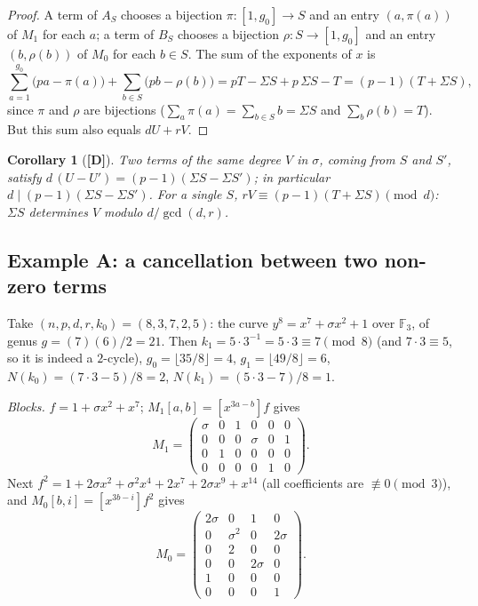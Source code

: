 \documentclass[11pt,a4paper]{article}
\newtheorem{corollary}[theorem]{Corollary}
\newcommand{\F}{\mathbb{F}}
\begin{document}
\begin{proof}
A term of $A_S$ chooses a bijection $\pi:[1,g_0]\to S$ and an entry
$(a,\pi(a))$ of $M_1$ for each $a$; a term of $B_S$ chooses a bijection
$\rho:S\to[1,g_0]$ and an entry $(b,\rho(b))$ of $M_0$ for each $b\in S$. The sum
of the exponents of $x$ is
$$\sum_{a=1}^{g_0}\bigl(pa-\pi(a)\bigr)+\sum_{b\in S}\bigl(pb-\rho(b)\bigr)
=pT-\Sigma S+p\,\Sigma S-T=(p-1)(T+\Sigma S),$$
since $\pi$ and $\rho$ are bijections ($\sum_a\pi(a)=\sum_{b\in S}b=\Sigma S$ and
$\sum_b\rho(b)=T$). But this sum also equals $dU+rV$. \end{proof}

\begin{corollary}[\textbf{[D]}]
Two terms of the same degree $V$ in $\sigma$, coming from $S$ and $S'$, satisfy
$d\,(U-U')=(p-1)(\Sigma S-\Sigma S')$; in particular
$d\mid(p-1)(\Sigma S-\Sigma S')$. For a single $S$, $rV\equiv(p-1)(T+\Sigma S)
\pmod d$: $\Sigma S$ determines $V$ modulo $d/\gcd(d,r)$.
\end{corollary}

\subsection*{Example A: a cancellation between two non-zero terms}

Take $(n,p,d,r,k_0)=(8,3,7,2,5)$: the curve $y^8=x^7+\sigma x^2+1$ over $\F_3$,
of genus $g=(7)(6)/2=21$. Then $k_1=5\cdot3^{-1}=5\cdot3\equiv7\pmod 8$ (and
$7\cdot3\equiv5$, so it is indeed a $2$-cycle), $g_0=\lfloor35/8\rfloor=4$,
$g_1=\lfloor49/8\rfloor=6$, $N(k_0)=(7\cdot3-5)/8=2$, $N(k_1)=(5\cdot3-7)/8=1$.

\emph{Blocks.} $f=1+\sigma x^2+x^7$; $M_1[a,b]=[x^{3a-b}]f$ gives
$$M_1=\begin{pmatrix}\sigma&0&1&0&0&0\\0&0&0&\sigma&0&1\\0&1&0&0&0&0\\
0&0&0&0&1&0\end{pmatrix}.$$
Next $f^2=1+2\sigma x^2+\sigma^2x^4+2x^7+2\sigma x^9+x^{14}$ (all coefficients
are $\not\equiv0\pmod3$), and $M_0[b,i]=[x^{3b-i}]f^2$ gives
$$M_0=\begin{pmatrix}2\sigma&0&1&0\\0&\sigma^2&0&2\sigma\\0&2&0&0\\
0&0&2\sigma&0\\1&0&0&0\\0&0&0&1\end{pmatrix}.$$
\end{document}
